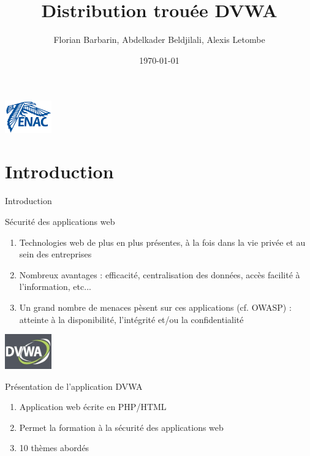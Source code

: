 \documentclass[8pt]{beamer}
\title{Distribution trouée DVWA}
\author{Florian Barbarin, Abdelkader Beldjilali, Alexis Letombe}
\date{\today}
\begin{document}
\begin{titlepage}
\begin{center}
	\includegraphics[width=2cm]{../images/enac.png}
\end{center}
\end{titlepage}



\begin{frame}
	\tableofcontents[]
\end{frame}




\section{Introduction}

\begin{frame}
  \tableofcontents[sectionstyle=show/shaded,subsectionstyle=shaded]
\end{frame}

\begin{frame}{Introduction}



	\begin{block}{Sécurité des applications web}
		\begin{enumerate}[\ding{217}]
			\item Technologies web de plus en plus présentes, à la fois dans la vie privée et au sein des entreprises
			\item Nombreux avantages : efficacité, centralisation des données, accès facilité à l'information, etc... 
			\item Un grand nombre de menaces pèsent sur ces applications (cf. OWASP) : atteinte à la disponibilité, l'intégrité et/ou la confidentialité
		\end{enumerate}
	\end{block}
	
\begin{center}
	\includegraphics[width=2cm]{../images/logo.jpg}
\end{center}

	\begin{block}{Présentation de l'application DVWA}
		\begin{enumerate}[\ding{217}]
			\item Application web écrite en PHP/HTML 
			\item Permet la formation à la sécurité des applications web
			\item 10 thèmes abordés
		\end{enumerate}
	\end{block}
	

\end{frame}
\end{document}
